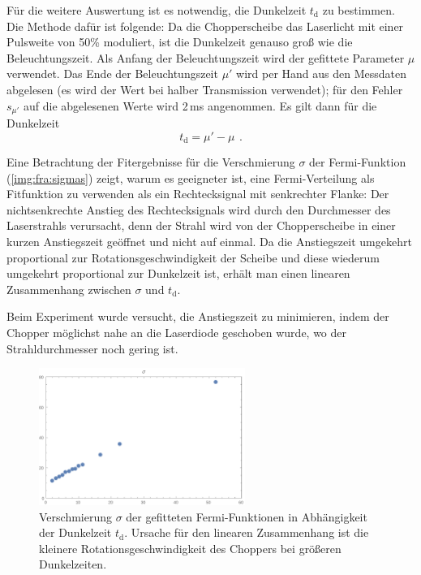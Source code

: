 Für die weitere Auswertung ist es notwendig, die Dunkelzeit $t_\text{d}$ zu bestimmen.
Die Methode dafür ist folgende:
Da die Chopperscheibe das Laserlicht mit einer Pulsweite von 50\% moduliert,
ist die Dunkelzeit genauso groß wie die Beleuchtungszeit.
Als Anfang der Beleuchtungszeit wird der gefittete Parameter $\mu$ verwendet.
Das Ende der Beleuchtungszeit $\mu'$ wird per Hand aus den Messdaten abgelesen
(es wird der Wert bei halber Transmission verwendet);
für den Fehler $s_{\mu'}$ auf die abgelesenen Werte wird 2\,ms angenommen.
Es gilt dann für die Dunkelzeit
\begin{equation}
  t_\text{d}=\mu'-\mu \ \, .
\end{equation}

Eine Betrachtung der Fitergebnisse für die Verschmierung $\sigma$ der Fermi-Funktion
(\autoref{img:fra:sigmas}) zeigt,
warum es geeigneter ist, eine Fermi-Verteilung als Fitfunktion zu verwenden als ein
Rechtecksignal mit senkrechter Flanke:
Der nichtsenkrechte Anstieg des Rechtecksignals wird durch den Durchmesser des Laserstrahls verursacht, denn
der Strahl wird von der Chopperscheibe in einer kurzen Anstiegszeit geöffnet und nicht auf einmal.
Da die Anstiegszeit umgekehrt proportional zur Rotationsgeschwindigkeit der Scheibe und diese
wiederum umgekehrt proportional zur Dunkelzeit ist, erhält man einen linearen Zusammenhang
zwischen $\sigma$ und $t_\text{d}$.

Beim Experiment wurde versucht, die Anstiegszeit zu minimieren, indem der Chopper möglichst
nahe an die Laserdiode geschoben wurde, wo der Strahldurchmesser noch gering ist.

\begin{figure}[H]
\begin{center}
  \includegraphics[width=0.6\textwidth]{../img/part6/sigmas.pdf}
  \caption{Verschmierung $\sigma$ der gefitteten Fermi-Funktionen in Abhängigkeit der Dunkelzeit $t_\text{d}$.
  Ursache für den linearen Zusammenhang ist die kleinere Rotationsgeschwindigkeit des Choppers bei
  größeren Dunkelzeiten.}
  \label{img:fra:sigmas}
\end{center}
\end{figure}

